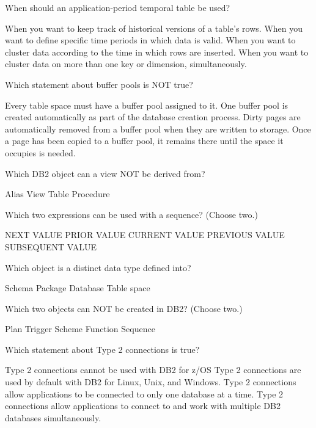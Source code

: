 \documentclass[11pt]{exam}
\begin{document}
\begin{questions}
\newpage
\question[1]
When should an application-period temporal table be used?
\begin{choices}
\choice When you want to keep track of historical versions of a table's rows.
\choice When you want to define specific time periods in which data is valid.
\choice When you want to cluster data according to the time in which rows are inserted.
\choice When you want to cluster data on more than one key or dimension, simultaneously.
\end{choices}

\question[1]
Which statement about buffer pools is NOT true?
\begin{choices}
\choice Every table space must have a buffer pool assigned to it.
\choice One buffer pool is created automatically as part of the database creation process.
\choice Dirty pages are automatically removed from a buffer pool when they are written to storage.
\choice Once a page has been copied to a buffer pool, it remains there until the space it occupies is 
needed.
\end{choices}

\question[1]
Which DB2 object can a view NOT be derived from?
\begin{choices}
\choice Alias
\choice View
\choice Table
\choice Procedure
\end{choices}

\question[1]
Which two expressions can be used with a sequence? (Choose two.)
\begin{choices}
\choice NEXT VALUE
\choice PRIOR VALUE
\choice CURRENT VALUE
\choice PREVIOUS VALUE
\choice SUBSEQUENT VALUE
\end{choices}

\question[1]
Which object is a distinct data type defined into?
\begin{choices}
\choice Schema
\choice Package
\choice Database
\choice Table space
\end{choices}

\question[1]
Which two objects can NOT be created in DB2? (Choose two.)
\begin{choices}
\choice Plan
\choice Trigger
\choice Scheme
\choice Function
\choice Sequence
\end{choices}

\newpage
\question[1]
Which statement about Type 2 connections is true?
\begin{choices}
\choice Type 2 connections cannot be used with DB2 for z/OS
\choice Type 2 connections are used by default with DB2 for Linux, Unix, and Windows.
\choice Type 2 connections allow applications to be connected to only one database at a time.
\choice Type 2 connections allow applications to connect to and work with multiple DB2 databases 
simultaneously.
\end{choices}


\end{questions}
\end{document}
